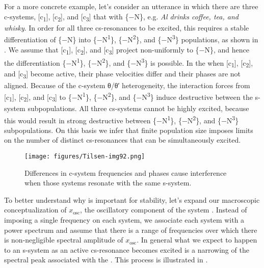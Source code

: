   For a more concrete example, let's consider an utterance in which there are three c-systems, [c\textsubscript{1}], [c\textsubscript{2}], and [c\textsubscript{3}] that  with \{−N\}, e.g. \textit{Al drinks coffee, tea, and whisky}. In order for all three cs-resonances to be excited, this requires a stable differentiation of \{−N\} into \{−N\textsuperscript{1}\}, \{−N\textsuperscript{2}\}, and \{−N\textsuperscript{3}\} populations, as shown in {}. We assume that [c\textsubscript{1}], [c\textsubscript{2}], and [c\textsubscript{3}] project non-uniformly to \{−N\}, and hence the differentiation \{−N\textsuperscript{1}\}, \{−N\textsuperscript{2}\}, and \{−N\textsuperscript{3}\} is possible. In the  when [c\textsubscript{1}], [c\textsubscript{2}], and [c\textsubscript{3}] become active, their phase velocities differ and their phases are not aligned. Because of the c-system θ/θ′ heterogeneity, the interaction forces from [c\textsubscript{1}], [c\textsubscript{2}], and [c\textsubscript{3}] to \{−N\textsuperscript{1}\}, \{−N\textsuperscript{2}\}, and \{−N\textsuperscript{3}\} induce destructive  between the s-system subpopulations. All three cs-systems cannot be highly excited, because this would result in strong destructive  between \{−N\textsuperscript{1}\}, \{−N\textsuperscript{2}\}, and \{−N\textsuperscript{3}\} subpopulations. On this basis we infer that finite population size imposes limits on the number of distinct cs-resonances that can be simultaneously excited.

  
\begin{figure}
\texttt{[image: figures/Tilsen-img92.png]}
\caption{Differences in c-system frequencies and phases cause interference when those systems resonate with the same s-system.}
\label{fig:4:42}
\end{figure}
 

  To better understand why  is important for stability, let's expand our macroscopic conceptualization of $x_{\text{osc}}$, the oscillatory component of the system . Instead of imposing a single frequency on each system, we associate each system with a power spectrum and assume that there is a range of frequencies over which there is non-negligible spectral amplitude of $x_{\text{osc}}$. In general what we expect to happen to an s-system as an active cs-resonance becomes excited is a narrowing of the spectral peak associated with the . This process is illustrated in {}.

